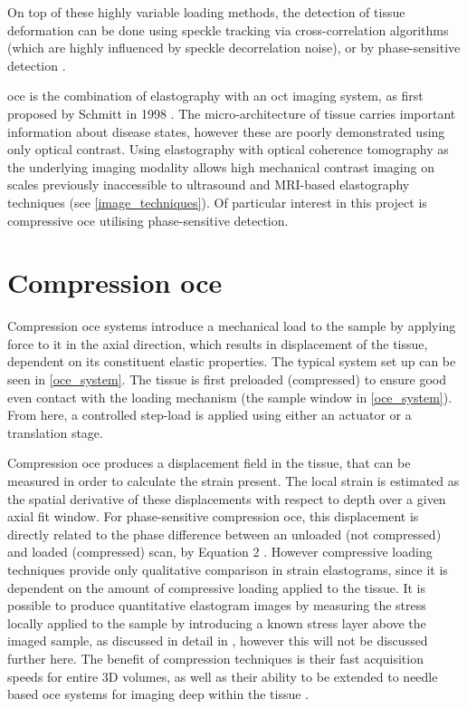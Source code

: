 On top of these highly variable loading methods, the detection of tissue deformation can be done using speckle tracking via cross-correlation algorithms (which are highly influenced by speckle decorrelation noise), or by phase-sensitive detection \cite{kennedy_strain_2012}.

\ac{oce} is the combination of elastography with an \ac{oct} imaging system, as first proposed by Schmitt in 1998 \cite{schmitt_oct_1998}. The micro-architecture of tissue carries important information about disease states, however these are poorly demonstrated using only optical contrast. Using elastography with optical coherence tomography as the underlying imaging modality allows high mechanical contrast imaging on scales previously inaccessible to ultrasound and MRI-based elastography techniques (see \autoref{image_techniques}). Of particular interest in this project is compressive \ac{oce} utilising phase-sensitive detection. 

\section{Compression \ac{oce}}\label{compression_oce}    

Compression \ac{oce} systems introduce a mechanical load to the sample by applying force to it in the axial direction, which results in displacement of the tissue, dependent on its constituent elastic properties. The typical system set up can be seen in \autoref{oce_system}. The tissue is first preloaded (compressed) to ensure good even contact with the loading mechanism (the sample window in \autoref{oce_system}). From here, a controlled step-load is applied using either an actuator or a translation stage.

Compression \ac{oce} produces a displacement field in the tissue, that can be measured in order to calculate the strain present. The local strain is estimated as the spatial derivative of these displacements with respect to depth \cite{kennedy_review_2014} over a given axial fit window. For phase-sensitive compression \ac{oce}, this displacement is directly related to the phase difference between an unloaded (not compressed) and loaded (compressed) scan, by Equation 2 \cite{kennedy_strain_2012}. However compressive loading techniques provide only qualitative comparison in strain elastograms, since it is dependent on the amount of compressive loading applied to the tissue. It is possible to produce quantitative elastogram images by measuring the stress locally applied to the sample by introducing a known stress layer above the imaged sample, as discussed in detail in \cite{kennedy_quantitative_2015}, however this will not be discussed further here. The benefit of compression techniques is their fast acquisition speeds for entire 3D volumes, as well as their ability to be extended to needle based \ac{oce} systems for imaging deep within the tissue \cite{kennedy_review_2014}. 

